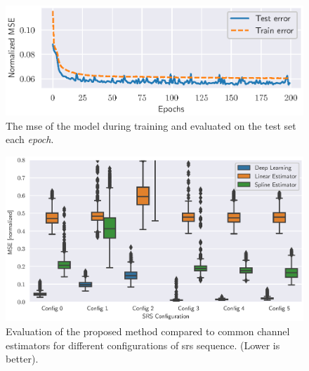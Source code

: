 \begin{figure}
    \centering
    \includegraphics{chapters/part_uplink/figures/results/channel_estimation/Training_test_error.eps}
    \caption{The \gls{mse} of the model during training and evaluated on the test set each \emph{epoch}.}
    \label{fig:training_test_error_channel_estimator}
\end{figure}

\begin{figure}
    \centering
    \includegraphics{chapters/part_uplink/figures/results/channel_estimation/srs_configuration_error_boxplot.eps}
    \caption{Evaluation of the proposed method compared to common channel estimators for different configurations of \gls{srs} sequence. (Lower is better).}
    \label{fig:srs_configuration_error_boxplot}
\end{figure}

